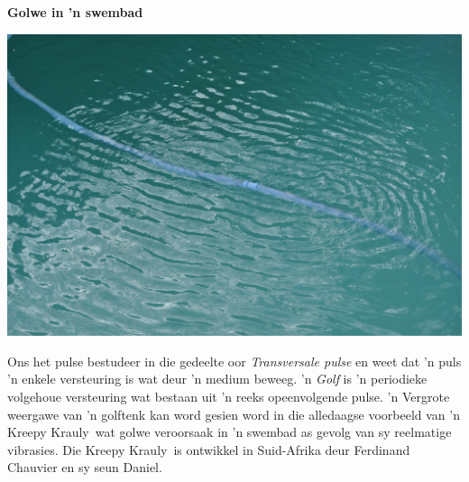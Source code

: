             \nopagebreak
\begin{minipage}{.5\textwidth}
\textbf{Golwe in 'n swembad}\par
 \includegraphics[width=.8\textwidth]{photos/kreepykrawly.jpg}
\end{minipage}
\begin{minipage}{.5\textwidth}  
Ons het pulse bestudeer in die gedeelte oor \textit{Transversale pulse} en weet dat  'n puls  'n enkele versteuring is wat deur  'n medium beweeg. 'n \textsl{Golf} is 'n periodieke volgehoue versteuring wat bestaan uit  'n reeks opeenvolgende pulse. 'n Vergrote weergawe van  'n golftenk kan word  gesien word in die alledaagse voorbeeld van 'n Kreepy Krauly\textregistered\ wat golwe veroorsaak in  'n swembad as gevolg van sy reelmatige vibrasies. Die Kreepy Krauly\textregistered\ is ontwikkel in Suid-Afrika deur Ferdinand Chauvier en sy seun Daniel.\\
\end{minipage}
